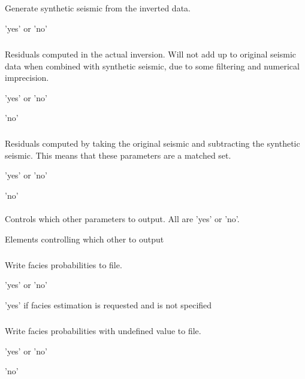 \subparagraph{}
 \slist
   \item \Description Generate synthetic seismic from the inverted data.
   \item \Argument 'yes' or 'no'
   \item \Default
 \elist

\subparagraph{}
 \slist
   \item \Description Residuals computed in the actual inversion. Will not add up to original seismic data when combined with synthetic seismic, due to some filtering and numerical imprecision.
   \item \Argument 'yes' or 'no'
   \item \Default 'no'
\elist

\subparagraph{}
 \slist
   \item \Description Residuals computed by taking the original seismic and subtracting the synthetic seismic. This means that these parameters are a matched set.
   \item \Argument 'yes' or 'no'
   \item \Default 'no'
\elist

\paragraph{}
 \slist
   \item \Description Controls which other parameters to output. All are 'yes' or 'no'.
   \item \Argument Elements controlling which other to output
   \item \Default
 \elist

\subparagraph{}
 \slist
   \item \Description Write facies probabilities to file.
   \item \Argument 'yes' or 'no'
   \item \Default 'yes' if facies estimation is requested and  is not specified
 \elist

\subparagraph{}
 \slist
   \item \Description Write facies probabilities with undefined value to file.
   \item \Argument 'yes' or 'no'
   \item \Default 'no'
 \elist

